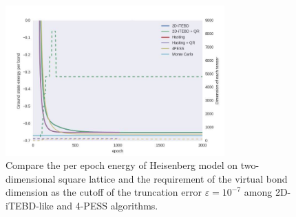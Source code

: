 \begin{figure}[H]
	\centering
	\includegraphics[width=0.75\textwidth]{figures/compare_4pess.jpeg}
	\caption[Compare the per epoch energy of Heisenberg model on two-dimensional square lattice and the requirement of the virtaul bond dimension as the cutoff of the truncation error $\varepsilon = 10^{-7}$ among 2D-iTEBD-like and 4-PESS algorithms]{Compare the per epoch energy of Heisenberg model on two-dimensional square lattice and the requirement of the virtual bond dimension as the cutoff of the truncation error $\varepsilon = 10^{-7}$ among 2D-iTEBD-like and 4-PESS algorithms.}
	\label{fig4333}
\end{figure}
